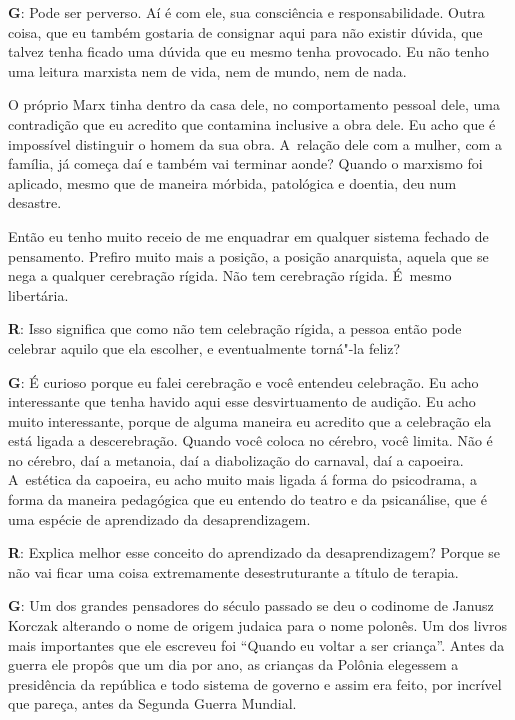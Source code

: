 \textbf{G}: Pode ser perverso. Aí é com ele, sua consciência e
responsabilidade. Outra coisa, que eu também gostaria de consignar aqui
para não existir dúvida, que talvez tenha ficado uma dúvida que eu mesmo
tenha provocado. Eu não tenho uma leitura marxista nem de vida, nem de
mundo, nem de nada.

 

O próprio Marx tinha dentro da casa dele, no comportamento pessoal dele,
uma contradição que eu acredito que contamina inclusive a obra dele. Eu
acho que é impossível distinguir o homem da sua obra. A~relação dele com
a mulher, com a família, já começa daí e também vai terminar aonde?
Quando o marxismo foi aplicado, mesmo que de maneira mórbida, patológica
e doentia, deu num desastre.

 

Então eu tenho muito receio de me enquadrar em qualquer sistema fechado
de pensamento. Prefiro muito mais a posição, a posição anarquista,
aquela que se nega a qualquer cerebração rígida. Não tem cerebração
rígida. É~mesmo libertária.

 

\textbf{R}: Isso significa que como não tem celebração rígida, a pessoa
então pode celebrar aquilo que ela escolher, e eventualmente torná"-la
feliz?

 

\textbf{G}: É curioso porque eu falei cerebração e você entendeu
celebração. Eu acho interessante que tenha havido aqui esse
desvirtuamento de audição. Eu acho muito interessante, porque de alguma
maneira eu acredito que a celebração ela está ligada a descerebração.
Quando você coloca no cérebro, você limita. Não é no cérebro, daí a
metanoia, daí a diabolização do carnaval, daí a capoeira. A~estética da
capoeira, eu acho muito mais ligada á forma do psicodrama, a forma da
maneira pedagógica que eu entendo do teatro e da psicanálise, que é uma
espécie de aprendizado da desaprendizagem.

 

\textbf{R}: Explica melhor esse conceito do aprendizado da
desaprendizagem? Porque se não vai ficar uma coisa extremamente
desestruturante a título de terapia.

 

\textbf{G}: Um dos grandes pensadores do século passado se deu o
codinome de Janusz Korczak alterando o nome de origem judaica para o
nome polonês. Um dos livros mais importantes que ele escreveu foi
``Quando eu voltar a ser criança''. Antes da guerra ele propôs que um
dia por ano, as crianças da Polônia elegessem a presidência da república
e todo sistema de governo e assim era feito, por incrível que pareça,
antes da Segunda Guerra Mundial.

